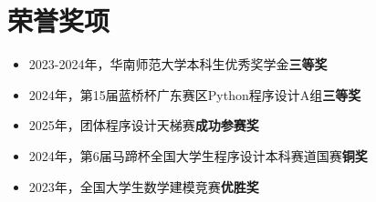 \section{荣誉奖项}
\begin{normalsize}
  \begin{itemize}[parsep=0.5ex]
    \item 2023-2024年，华南师范大学本科生优秀奖学金\textbf{三等奖}
    \item 2024年，第15届蓝桥杯广东赛区Python程序设计A组\textbf{三等奖}
    \item 2025年，团体程序设计天梯赛\textbf{成功参赛奖}
    \item 2024年，第6届马蹄杯全国大学生程序设计本科赛道国赛\textbf{铜奖}
    \item 2023年，全国大学生数学建模竞赛\textbf{优胜奖}
  \end{itemize}
\end{normalsize}